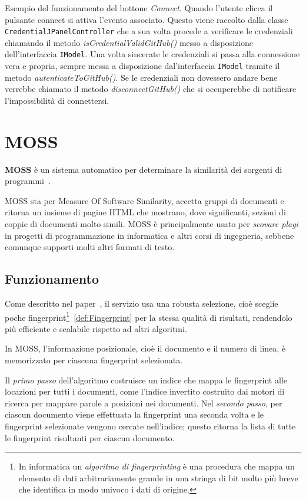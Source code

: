 			Esempio del funzionamento del bottone \textit{Connect}. Quando l'utente clicca il pulsante connect si attiva l'evento associato. Questo viene raccolto dalla classe \verb|CredentialJPanelController| che a sua volta procede a verificare le credenziali chiamando il metodo \textit{isCredentialValidGitHub()} messo a disposizione dell'interfaccia \verb|IModel|. Una volta sincerate le credenziali si passa alla connessione vera e propria, sempre messa a disposizione dal'interfaccia \verb|IModel| tramite il metodo \textit{autenticateToGitHub()}. Se le credenziali non dovessero andare bene verrebbe chiamato il metodo \textit{disconnectGitHub()} che si occuperebbe di notificare l'impossibilità di connettersi.
			
			

	\section{MOSS}\label{def:MOSS}	
		\textbf{MOSS} è un sistema automatico per determinare la similarità dei sorgenti di programmi~\citep{AikenMOSS}. 
		
		MOSS sta per Measure Of Software Similarity, accetta gruppi di documenti e ritorna un insieme di pagine HTML che mostrano, dove significanti, sezioni di coppie di documenti molto simili. MOSS è principalmente usato per \textit{scovare plagi} in progetti di programmazione in informatica e altri corsi di ingegneria, sebbene comunque supporti molti altri formati di testo. 
		
		\subsection[Funzionamento]{Funzionamento}
			Come descritto nel paper~\citep{Clough2000}, il servizio usa una robusta selezione, cioè sceglie poche fingerprint\footnote{In informatica un \textit{algoritmo di fingerprinting} è una procedura che mappa un elemento di dati arbitrariamente grande in una stringa di bit molto più breve che identifica in modo univoco i dati di origine.}~\ref{def:Fingerprint} per la stessa qualità di risultati, rendendolo più efficiente e scalabile rispetto ad altri algoritmi.
			
			In MOSS, l'informazione posizionale, cioè il documento e il numero di linea, è memorizzato per ciascuna fingerprint selezionata.
			
			Il \textit{primo passo} dell'algoritmo costruisce un indice che mappa le fingerprint alle locazioni per tutti i documenti, come l'indice invertito costruito dai motori di ricerca per mappare parole a posizioni nei documenti.
			Nel \textit{secondo passo}, per ciascun documento viene effettuata la fingerprint una seconda volta e le fingerprint selezionate vengono cercate nell'indice; questo ritorna la lista di tutte le fingerprint risultanti per ciascun documento. 
			
